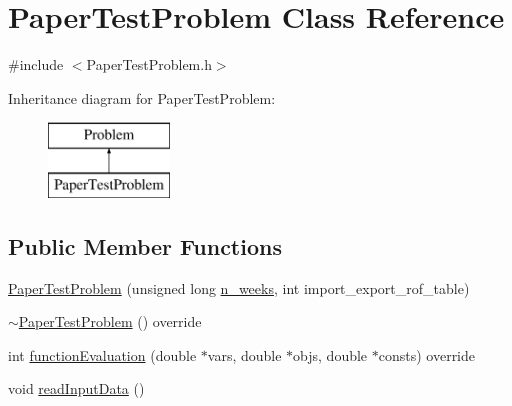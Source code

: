 \hypertarget{classPaperTestProblem}{}\section{Paper\+Test\+Problem Class Reference}
\label{classPaperTestProblem}


{\ttfamily \#include $<$Paper\+Test\+Problem.\+h$>$}

Inheritance diagram for Paper\+Test\+Problem\+:\begin{figure}[H]
\begin{center}
\leavevmode
\includegraphics[height=2.000000cm]{classPaperTestProblem}
\end{center}
\end{figure}
\subsection*{Public Member Functions}
\begin{DoxyCompactItemize}
\item 
\mbox{\hyperlink{classPaperTestProblem_acc053a5b4515f3959494ce58c763d582_acc053a5b4515f3959494ce58c763d582}{Paper\+Test\+Problem}} (unsigned long \mbox{\hyperlink{classProblem_ac7513bb0ecdfa4bbb7d2ada3595d71ec_ac7513bb0ecdfa4bbb7d2ada3595d71ec}{n\+\_\+weeks}}, int import\+\_\+export\+\_\+rof\+\_\+table)
\item 
\mbox{\hyperlink{classPaperTestProblem_a571a92266d4c58ebc27e20391f7ad81b_a571a92266d4c58ebc27e20391f7ad81b}{$\sim$\+Paper\+Test\+Problem}} () override
\item 
int \mbox{\hyperlink{classPaperTestProblem_a6db78df74d40f69a750b164caaca75c7_a6db78df74d40f69a750b164caaca75c7}{function\+Evaluation}} (double $\ast$vars, double $\ast$objs, double $\ast$consts) override
\item 
void \mbox{\hyperlink{classPaperTestProblem_ae4bcc17d6ceab628f88174306d54fdc9_ae4bcc17d6ceab628f88174306d54fdc9}{read\+Input\+Data}} ()
\end{DoxyCompactItemize}
